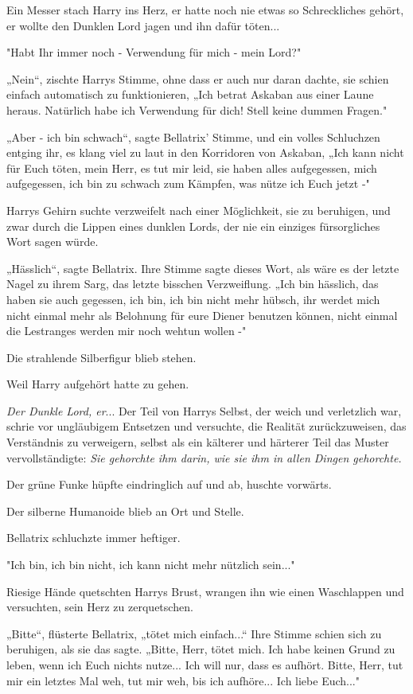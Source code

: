 {Ein Messer stach Harry ins Herz, er hatte noch nie etwas so Schreckliches gehört, er wollte den Dunklen Lord jagen und ihn dafür töten...

"Habt Ihr immer noch - Verwendung für mich - mein Lord?"

„Nein“, zischte Harrys Stimme, ohne dass er auch nur daran dachte, sie schien einfach automatisch zu funktionieren, „Ich betrat Askaban aus einer Laune heraus. Natürlich habe ich Verwendung für dich! Stell keine dummen Fragen."

„Aber - ich bin schwach“, sagte Bellatrix' Stimme, und ein volles Schluchzen entging ihr, es klang viel zu laut in den Korridoren von Askaban, „Ich kann nicht für Euch töten, mein Herr, es tut mir leid, sie haben alles aufgegessen, mich aufgegessen, ich bin zu schwach zum Kämpfen, was nütze ich Euch jetzt -"

Harrys Gehirn suchte verzweifelt nach einer Möglichkeit, sie zu beruhigen, und zwar durch die Lippen eines dunklen Lords, der nie ein einziges fürsorgliches Wort sagen würde.

„Hässlich“, sagte Bellatrix. Ihre Stimme sagte dieses Wort, als wäre es der letzte Nagel zu ihrem Sarg, das letzte bisschen Verzweiflung. „Ich bin hässlich, das haben sie auch gegessen, ich bin, ich bin nicht mehr hübsch, ihr werdet mich nicht einmal mehr als Belohnung für eure Diener benutzen können, nicht einmal die Lestranges werden mir noch wehtun wollen -"

Die strahlende Silberfigur blieb stehen.

Weil Harry aufgehört hatte zu gehen.

\emph{Der Dunkle Lord, er}... Der Teil von Harrys Selbst, der weich und verletzlich war, schrie vor ungläubigem Entsetzen und versuchte, die Realität zurückzuweisen, das Verständnis zu verweigern, selbst als ein kälterer und härterer Teil das Muster vervollständigte: \emph{Sie gehorchte ihm darin, wie sie ihm in allen Dingen gehorchte.}

Der grüne Funke hüpfte eindringlich auf und ab, huschte vorwärts.

Der silberne Humanoide blieb an Ort und Stelle.

Bellatrix schluchzte immer heftiger.

"Ich bin, ich bin nicht, ich kann nicht mehr nützlich sein..."

Riesige Hände quetschten Harrys Brust, wrangen ihn wie einen Waschlappen und versuchten, sein Herz zu zerquetschen.

„Bitte“, flüsterte Bellatrix, „tötet mich einfach...“ Ihre Stimme schien sich zu beruhigen, als sie das sagte. „Bitte, Herr, tötet mich. Ich habe keinen Grund zu leben, wenn ich Euch nichts nutze... Ich will nur, dass es aufhört. Bitte, Herr, tut mir ein letztes Mal weh, tut mir weh, bis ich aufhöre... Ich liebe Euch..."

}
